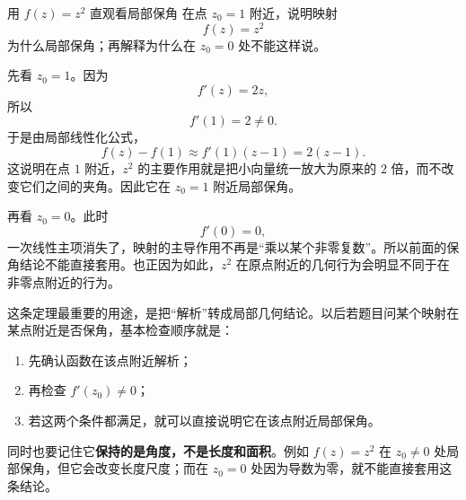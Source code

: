 \begin{lizi}{用 $f(z)=z^2$ 直观看局部保角}{}
在点 $z_0=1$ 附近，说明映射
\[
    f(z)=z^2
\]
为什么局部保角；再解释为什么在 $z_0=0$ 处不能这样说。

\begin{jie}
先看 $z_0=1$。因为
\[
    f'(z)=2z,
\]
所以
\[
    f'(1)=2\neq 0.
\]
于是由局部线性化公式，
\[
    f(z)-f(1)\approx f'(1)(z-1)=2(z-1).
\]
这说明在点 $1$ 附近，$z^2$ 的主要作用就是把小向量统一放大为原来的 $2$ 倍，而不改变它们之间的夹角。因此它在 $z_0=1$ 附近局部保角。

再看 $z_0=0$。此时
\[
    f'(0)=0,
\]
一次线性主项消失了，映射的主导作用不再是``乘以某个非零复数''。所以前面的保角结论不能直接套用。也正因为如此，$z^2$ 在原点附近的几何行为会明显不同于在非零点附近的行为。
\end{jie}
\end{lizi}

\begin{tishi}[看到这条定理时要立刻想到什么]
这条定理最重要的用途，是把``解析''转成局部几何结论。以后若题目问某个映射在某点附近是否保角，基本检查顺序就是：
\begin{enumerate}
    \item 先确认函数在该点附近解析；
    \item 再检查 $f'(z_0)\neq 0$；
    \item 若这两个条件都满足，就可以直接说明它在该点附近局部保角。
\end{enumerate}

同时也要记住它\textbf{保持的是角度，不是长度和面积}。例如 $f(z)=z^2$ 在 $z_0\neq 0$ 处局部保角，但它会改变长度尺度；而在 $z_0=0$ 处因为导数为零，就不能直接套用这条结论。
\end{tishi}


